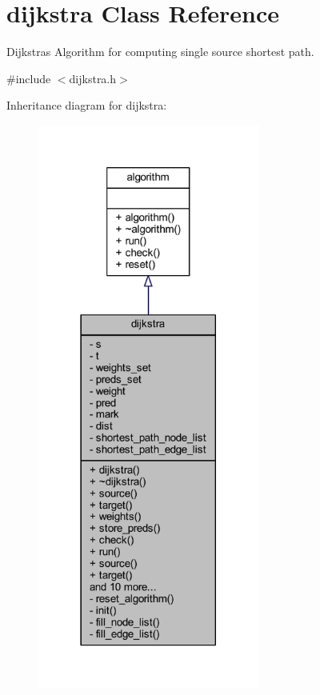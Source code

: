 \hypertarget{classdijkstra}{}\section{dijkstra Class Reference}
\label{classdijkstra}


Dijkstra\textquotesingle{}s Algorithm for computing single source shortest path.  




{\ttfamily \#include $<$dijkstra.\+h$>$}



Inheritance diagram for dijkstra\+:\nopagebreak
\begin{figure}[H]
\begin{center}
\leavevmode
\includegraphics[width=206pt]{classdijkstra__inherit__graph}
\end{center}
\end{figure}


